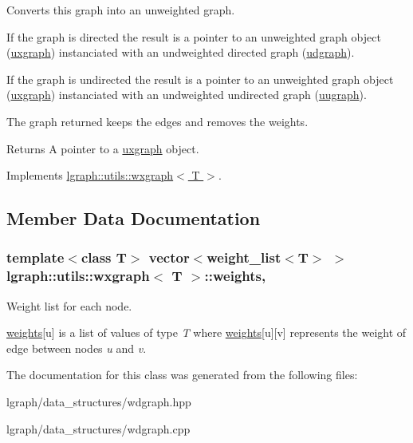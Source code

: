 Converts this graph into an unweighted graph. 

If the graph is directed the result is a pointer to an unweighted graph object (\hyperlink{classlgraph_1_1utils_1_1uxgraph}{uxgraph}) instanciated with an undweighted directed graph (\hyperlink{classlgraph_1_1utils_1_1udgraph}{udgraph}).

If the graph is undirected the result is a pointer to an unweighted graph object (\hyperlink{classlgraph_1_1utils_1_1uxgraph}{uxgraph}) instanciated with an undweighted undirected graph (\hyperlink{classlgraph_1_1utils_1_1uugraph}{uugraph}).

The graph returned keeps the edges and removes the weights. \begin{DoxyReturn}{Returns}
A pointer to a \hyperlink{classlgraph_1_1utils_1_1uxgraph}{uxgraph} object. 
\end{DoxyReturn}


Implements \hyperlink{classlgraph_1_1utils_1_1wxgraph_a66d7a1fb48324c361d59dfa2d13db9eb}{lgraph\+::utils\+::wxgraph$<$ T $>$}.



\subsection{Member Data Documentation}
\subsubsection[{\texorpdfstring{weights}{weights}}]{\setlength{\rightskip}{0pt plus 5cm}template$<$class T$>$ vector$<${\bf weight\+\_\+list}$<$T$>$ $>$ {\bf lgraph\+::utils\+::wxgraph}$<$ T $>$\+::weights\hspace{0.3cm}{\ttfamily [protected]}, {\ttfamily [inherited]}}\hypertarget{classlgraph_1_1utils_1_1wxgraph_a15569c8c0fccb641709dc81eb0e29c94}{}\label{classlgraph_1_1utils_1_1wxgraph_a15569c8c0fccb641709dc81eb0e29c94}


Weight list for each node. 

\hyperlink{classlgraph_1_1utils_1_1wxgraph_a15569c8c0fccb641709dc81eb0e29c94}{weights}\mbox{[}u\mbox{]} is a list of values of type {\itshape T} where \hyperlink{classlgraph_1_1utils_1_1wxgraph_a15569c8c0fccb641709dc81eb0e29c94}{weights}\mbox{[}u\mbox{]}\mbox{[}v\mbox{]} represents the weight of edge between nodes {\itshape u} and {\itshape v}. 

The documentation for this class was generated from the following files\+:\begin{DoxyCompactItemize}
\item 
lgraph/data\+\_\+structures/wdgraph.\+hpp\item 
lgraph/data\+\_\+structures/wdgraph.\+cpp\end{DoxyCompactItemize}
